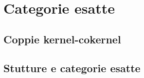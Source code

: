 
\chapter{Categorie esatte}

\section{Coppie kernel-cokernel}


\section{Stutture e categorie esatte}


